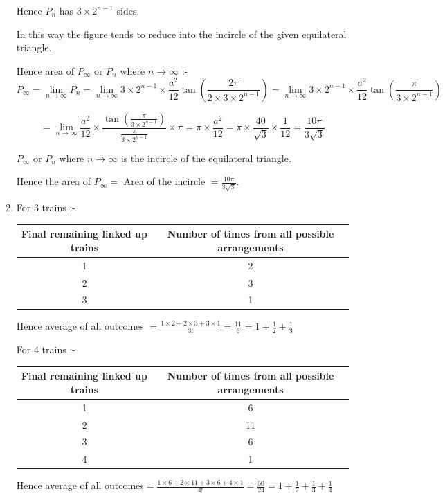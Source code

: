 \documentclass{article}
\begin{document}
\begin{enumerate}
Hence $P_n $ has $3\times 2^{n-1}$ sides.

In this way the figure tends to reduce into the incircle of the given equilateral triangle.

Hence area of $P_{\infty}$ or $P_n$ where $n \to \infty$ :-
$$ P_{\infty}= \lim \limits_{n \to \infty} P_n = \lim \limits_{n \to \infty} 3\times 2^{n-1}\times \frac{a^2}{12}\tan \left(\frac{2 \pi }{2\times 3\times 2^{n-1}} \right)=\lim \limits_{n \to \infty} 3\times 2^{n-1}\times \frac{a^2}{12} \tan \left(\frac{ \pi}{ 3\times 2^{n-1}}\right)$$

$$=  \lim \limits_{n \to \infty}\frac{a^2}{12}\times \frac{\tan \left(\frac{ \pi}{ 3\times 2^{n-1}}\right)}{\frac{\pi }{3\times 2^{n-1}}}\times \pi = \pi \times \frac{a^2}{12}=\pi \times \frac{40}{\sqrt{3}}\times \frac{1}{12}= \frac{10\pi}{3\sqrt{3}} $$

$P_{\infty}$ or $P_n$ where $n \to \infty$ is the incircle of the equilateral triangle.

Hence the area of $P_{\infty}=$ Area of the incircle $=\displaystyle{\frac{10\pi}{3\sqrt{3}}}$. 
\bigskip

\bigskip

\bigskip

\bigskip

\bigskip

\setcounter{enumi}{9}
\item For 3 trains :-
\begin{center}
  \begin{tabular}{c | c}
    Final remaining linked up trains & Number of times from all possible arrangements \\
    \hline
    1 & 2 \\
    2 & 3 \\
    3 & 1 \\
  \end{tabular}
 \end{center} 
Hence average of all outcomes $=\displaystyle{\frac{1\times 2+ 2\times 3+ 3\times 1}{3!}=\frac{11}{6}=1+\frac{1}{2}+\frac{1}{3}}$

For 4 trains :-
\begin{center}
    

  \begin{tabular}{c | c}
    Final remaining linked up trains & Number of times from all possible arrangements \\
    \hline
    1 & 6 \\
    2 & 11 \\
    3 & 6 \\
    4 & 1
  \end{tabular}
\end{center}
Hence average of all outcomes$=\displaystyle{\frac{1\times 6+ 2\times 11+ 3\times 6+4\times 1}{4!}=\frac{50}{24}=1+\frac{1}{2}+\frac{1}{3}+\frac{1}{4}}$


\end{enumerate}
\end{document}
